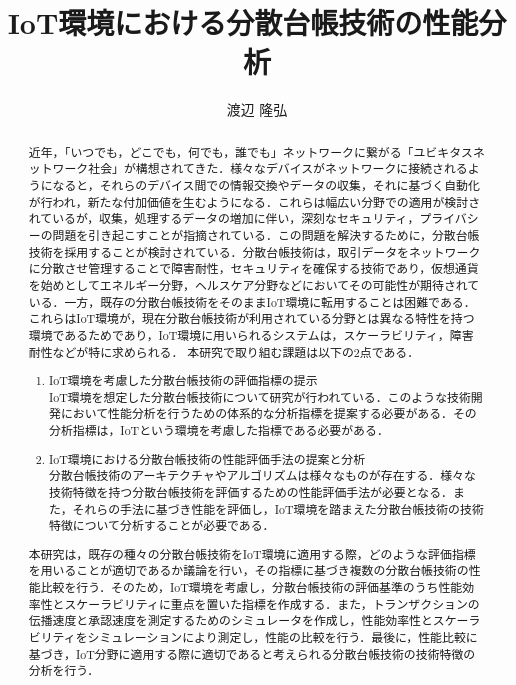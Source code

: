 \documentclass[japanese, macos]{KU2}
\begin{document}
\fontsize{12}{20} \selectfont
\title{IoT環境における分散台帳技術の性能分析}
\author{渡辺 隆弘}
\maketitle %

\begin{abstract}
近年，「いつでも，どこでも，何でも，誰でも」ネットワークに繋がる「ユビキタスネットワーク社会」が構想されてきた．様々なデバイスがネットワークに接続されるようになると，それらのデバイス間での情報交換やデータの収集，それに基づく自動化が行われ，新たな付加価値を生むようになる．これらは幅広い分野での適用が検討されているが，収集，処理するデータの増加に伴い，深刻なセキュリティ，プライバシーの問題を引き起こすことが指摘されている．この問題を解決するために，分散台帳技術を採用することが検討されている．分散台帳技術は，取引データをネットワークに分散させ管理することで障害耐性，セキュリティを確保する技術であり，仮想通貨を始めとしてエネルギー分野，ヘルスケア分野などにおいてその可能性が期待されている．一方，既存の分散台帳技術をそのままIoT環境に転用することは困難である．これらはIoT環境が，現在分散台帳技術が利用されている分野とは異なる特性を持つ環境であるためであり，IoT環境に用いられるシステムは，スケーラビリティ，障害耐性などが特に求められる．
本研究で取り組む課題は以下の2点である．
\begin{enumerate}
\item IoT環境を考慮した分散台帳技術の評価指標の提示\\
IoT環境を想定した分散台帳技術について研究が行われている．このような技術開発において性能分析を行うための体系的な分析指標を提案する必要がある．その分析指標は，IoTという環境を考慮した指標である必要がある．
\item IoT環境における分散台帳技術の性能評価手法の提案と分析\\
分散台帳技術のアーキテクチャやアルゴリズムは様々なものが存在する．様々な技術特徴を持つ分散台帳技術を評価するための性能評価手法が必要となる．また，それらの手法に基づき性能を評価し，IoT環境を踏まえた分散台帳技術の技術特徴について分析することが必要である．
\end{enumerate}
本研究は，既存の種々の分散台帳技術をIoT環境に適用する際，どのような評価指標を用いることが適切であるか議論を行い，その指標に基づき複数の分散台帳技術の性能比較を行う．そのため，IoT環境を考慮し，分散台帳技術の評価基準のうち性能効率性とスケーラビリティに重点を置いた指標を作成する．また，トランザクションの伝播速度と承認速度を測定するためのシミュレータを作成し，性能効率性とスケーラビリティをシミュレーションにより測定し，性能の比較を行う．最後に，性能比較に基づき，IoT分野に適用する際に適切であると考えられる分散台帳技術の技術特徴の分析を行う．\\

\end{abstract}
\end{document}
